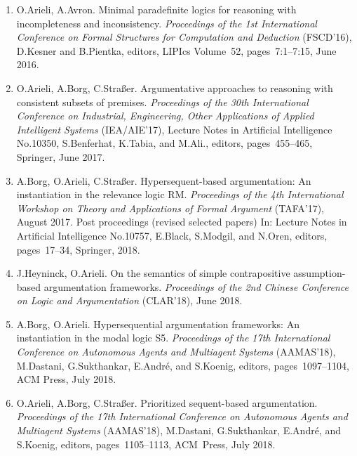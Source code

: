 \documentclass{article}
\begin{document}
\begin{enumerate}
   \item O.Arieli, A.Avron.
         Minimal paradefinite logics for reasoning with incompleteness and inconsistency.
         {\em Proceedings of the 1st International Conference on Formal Structures for Computation and Deduction\/}
         (FSCD'16), D.Kesner and B.Pientka, editors, LIPIcs Volume~52, pages~7:1--7:15, June 2016.

   \item O.Arieli, A.Borg, C.Stra{\ss}er.
         Argumentative approaches to reasoning with consistent subsets of premises.
         {\em Proceedings of the 30th International Conference on Industrial, Engineering, Other Applications
         of Applied Intelligent Systems\/} (IEA/AIE'17), Lecture Notes in Artificial Intelligence No.10350,
         S.Benferhat, K.Tabia, and M.Ali., editors, pages~455--465, Springer, June 2017.

  \item A.Borg, O.Arieli, C.Stra{\ss}er.
         Hypersequent-based argumentation: An instantiation in the relevance logic {RM}.
         {\em  Proceedings of the 4th International Workshop on Theory and Applications of Formal Argument\/}
         (TAFA'17), August 2017. Post proceedings (revised selected papers) In: Lecture Notes
         in Artificial Intelligence No.10757, E.Black, S.Modgil, and N.Oren, editors, pages~17--34,
         Springer, 2018.

  \item J.Heyninck, O.Arieli.
          On the semantics of simple contrapositive assumption-based argumentation frameworks.
          {\em Proceedings of the 2nd Chinese Conference on Logic and Argumentation\/} (CLAR'18), June 2018.

  \item A.Borg, O.Arieli.
          Hypersequential argumentation frameworks: An instantiation in the modal logic {S5}.
          {\em  Proceedings of the 17th International Conference on Autonomous Agents and Multiagent Systems\/}
          (AAMAS'18), M.Dastani, G.Sukthankar, E.Andr\'e, and S.Koenig, editors, pages~1097--1104,
          ACM Press, July 2018.

  \item O.Arieli, A.Borg, C.Stra{\ss}er.
          Prioritized sequent-based argumentation. {\em  Proceedings of the 17th International Conference on
          Autonomous Agents and Multiagent Systems\/} (AAMAS'18), M.Dastani, G.Sukthankar, E.Andr\'e,
          and S.Koenig, editors, pages~1105--1113, ACM~Press, July 2018.


\end{enumerate}
\end{document}
